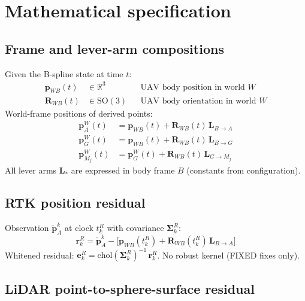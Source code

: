 
\section{Mathematical specification}
\label{sec:clic-math}

\subsection{Frame and lever-arm compositions}
\label{sec:frames}

Given the B-spline state at time $t$:
\begin{align}
  \mathbf{p}_{WB}(t) &\in \mathbb{R}^3 && \text{UAV body position in world $W$} \\
  \mathbf{R}_{WB}(t) &\in \mathrm{SO}(3) && \text{UAV body orientation in world $W$}
\end{align}
World-frame positions of derived points:
\begin{align}
  \mathbf{p}_A^W(t)     &= \mathbf{p}_{WB}(t) + \mathbf{R}_{WB}(t)\,\mathbf{L}_{B\to A} \\
  \mathbf{p}_G^W(t)     &= \mathbf{p}_{WB}(t) + \mathbf{R}_{WB}(t)\,\mathbf{L}_{B\to G} \\
  \mathbf{p}_{M_j}^W(t) &= \mathbf{p}_G^W(t) + \mathbf{R}_{WB}(t)\,\mathbf{L}_{G\to M_j}
\end{align}
All lever arms $\mathbf{L}_*$ are expressed in body frame $B$ (constants from configuration).

\subsection{RTK position residual}
\label{sec:rtk}

Observation $\tilde{\mathbf{p}}_A^k$ at clock $t_k^R$ with covariance $\boldsymbol{\Sigma}_k^R$:
\begin{equation}
  \mathbf{r}_k^R = \tilde{\mathbf{p}}_A^k - \bigl[\mathbf{p}_{WB}(t_k^R) + \mathbf{R}_{WB}(t_k^R)\,\mathbf{L}_{B\to A}\bigr]
\end{equation}
Whitened residual: $\mathbf{e}_k^R = \mathrm{chol}(\boldsymbol{\Sigma}_k^R)^{-1}\,\mathbf{r}_k^R$.
No robust kernel (FIXED fixes only).

\subsection{LiDAR point-to-sphere-surface residual}
\label{sec:lidar}

